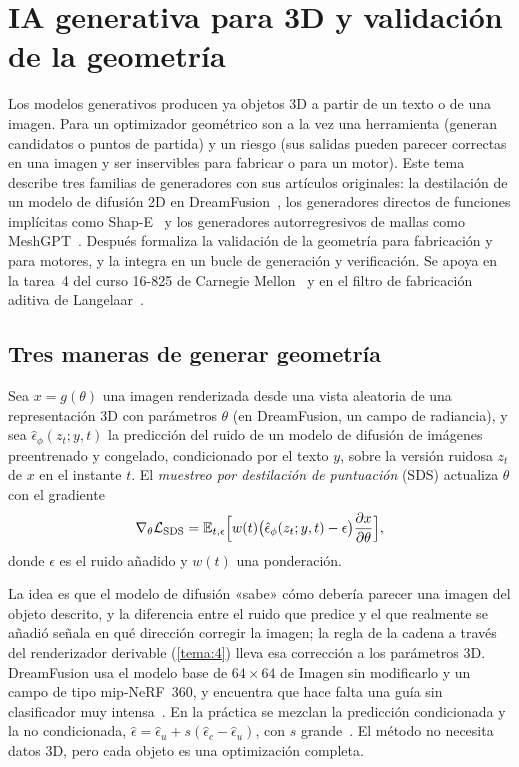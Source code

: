 \chapter{IA generativa para 3D y validación de la geometría}
\label{tema:6}

Los modelos generativos producen ya objetos 3D a partir de un texto o de una imagen. Para un optimizador geométrico son a la vez una herramienta (generan candidatos o puntos de partida) y un riesgo (sus salidas pueden parecer correctas en una imagen y ser inservibles para fabricar o para un motor). Este tema describe tres familias de generadores con sus artículos originales: la destilación de un modelo de difusión 2D en DreamFusion~\cite{dreamfusion}, los generadores directos de funciones implícitas como Shap-E~\cite{shape} y los generadores autorregresivos de mallas como MeshGPT~\cite{meshgpt}. Después formaliza la validación de la geometría para fabricación y para motores, y la integra en un bucle de generación y verificación. Se apoya en la tarea~4 del curso 16-825 de Carnegie Mellon~\cite{cmu16825} y en el filtro de fabricación aditiva de Langelaar~\cite{langelaar}.

\section{Tres maneras de generar geometría}

\begin{definicion}\label{def:sds}
Sea $x=g(\theta)$ una imagen renderizada desde una vista aleatoria de una representación 3D con parámetros $\theta$ (en DreamFusion, un campo de radiancia), y sea $\hat\epsilon_\phi(z_t;y,t)$ la predicción del ruido de un modelo de difusión de imágenes preentrenado y congelado, condicionado por el texto $y$, sobre la versión ruidosa $z_t$ de $x$ en el instante $t$. El \emph{muestreo por destilación de puntuación} (SDS) actualiza $\theta$ con el gradiente~\cite[§2.1]{dreamfusion}
\[
\nabla_\theta\mathcal{L}_{\text{SDS}}=\mathbb{E}_{t,\epsilon}\Bigl[w(t)\bigl(\hat\epsilon_\phi(z_t;y,t)-\epsilon\bigr)\frac{\partial x}{\partial\theta}\Bigr],
\]
donde $\epsilon$ es el ruido añadido y $w(t)$ una ponderación.
\end{definicion}

La idea es que el modelo de difusión «sabe» cómo debería parecer una imagen del objeto descrito, y la diferencia entre el ruido que predice y el que realmente se añadió señala en qué dirección corregir la imagen; la regla de la cadena a través del renderizador derivable (\cref{tema:4}) lleva esa corrección a los parámetros 3D. DreamFusion usa el modelo base de $64\times 64$ de Imagen sin modificarlo y un campo de tipo mip-NeRF~360, y encuentra que hace falta una guía sin clasificador muy intensa~\cite{dreamfusion}. En la práctica se mezclan la predicción condicionada y la no condicionada, $\hat\epsilon=\hat\epsilon_u+s(\hat\epsilon_c-\hat\epsilon_u)$, con $s$ grande~\cite{cmu16825}. El método no necesita datos 3D, pero cada objeto es una optimización completa.

